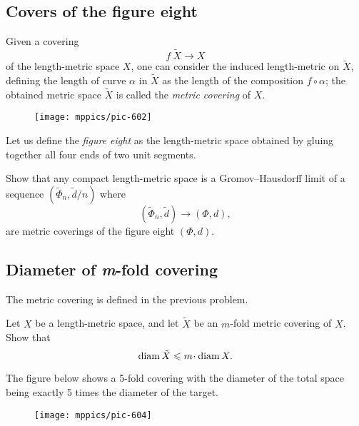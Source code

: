 

\subsection*{Covers of the figure eight}\label{figure-eight-1}

Given a covering 
\[f\:\tilde X \to X\]
of the length-metric space $X$,
one can consider the induced length-metric on $\tilde X$,
defining the length of curve $\alpha$ in $\tilde X$ as the length of the composition $f\circ\alpha$; the obtained metric space $\tilde X$ is called the  \emph{metric covering} of $X$.

{

\begin{wrapfigure}{o}{23 mm}
\vskip-4mm
\centering
\texttt{[image: mppics/pic-602]}
\end{wrapfigure}

Let us define the \emph{figure eight} as the length-metric space obtained by gluing together all four ends of two unit segments.

}

\begin{pr}
Show that any compact length-metric space 
is a Gromov--Hausdorff limit of a sequence $(\widetilde \Phi_n, \tilde d/n)$
where 
\[(\widetilde \Phi_n, \tilde d)\to(\Phi,d),\]
are metric coverings of the figure eight $(\Phi,d)$.
\end{pr}


\subsection*{Diameter of \textit{m}-fold covering\hard}\label{m-fold-cover}

The metric covering is defined in the previous problem.

\begin{pr}
Let $X$ be a length-metric space,
and let $\tilde X$ be an $m$-fold metric covering of $X$.
Show that
$$\diam\tilde X\le m\cdot \diam X.$$
\end{pr}

The figure below shows a 5-fold covering with the diameter of the total space being exactly 5 times the diameter of the target.

\begin{figure}[h!]
\vskip0mm
\centering
\texttt{[image: mppics/pic-604]}
\end{figure}

